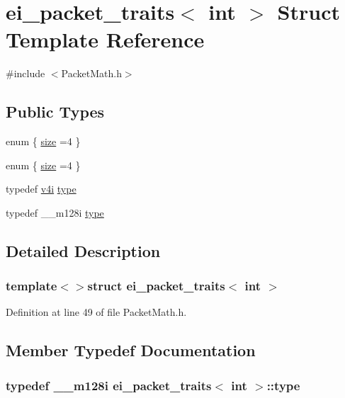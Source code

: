 \hypertarget{structei__packet__traits_3_01int_01_4}{\section{ei\-\_\-packet\-\_\-traits$<$ int $>$ Struct Template Reference}
\label{structei__packet__traits_3_01int_01_4}
}


{\ttfamily \#include $<$Packet\-Math.\-h$>$}

\subsection*{Public Types}
\begin{DoxyCompactItemize}
\item 
enum \{ \hyperlink{structei__packet__traits_3_01int_01_4_a8c99f9f13488f4720418b2975399d685ad774a4185410059fc6fdcd019df72d25}{size} =4
 \}
\item 
enum \{ \hyperlink{structei__packet__traits_3_01int_01_4_a8c99f9f13488f4720418b2975399d685ad774a4185410059fc6fdcd019df72d25}{size} =4
 \}
\item 
typedef \hyperlink{_alti_vec_2_packet_math_8h_a04a2325bab18a1292103e0dd8ef1046b}{v4i} \hyperlink{structei__packet__traits_3_01int_01_4_ab8a742bbade9c5789e2b1790f3739605}{type}
\item 
typedef \-\_\-\-\_\-m128i \hyperlink{structei__packet__traits_3_01int_01_4_aefa33030c1c9cbc829889f7ee63a9c15}{type}
\end{DoxyCompactItemize}


\subsection{Detailed Description}
\subsubsection*{template$<$$>$struct ei\-\_\-packet\-\_\-traits$<$ int $>$}



Definition at line 49 of file Packet\-Math.\-h.



\subsection{Member Typedef Documentation}
\hypertarget{structei__packet__traits_3_01int_01_4_aefa33030c1c9cbc829889f7ee63a9c15}{
\subsubsection[{type}]{\setlength{\rightskip}{0pt plus 5cm}typedef \-\_\-\-\_\-m128i {\bf ei\-\_\-packet\-\_\-traits}$<$ {\bf int} $>$\-::{\bf type}}}\label{structei__packet__traits_3_01int_01_4_aefa33030c1c9cbc829889f7ee63a9c15}


